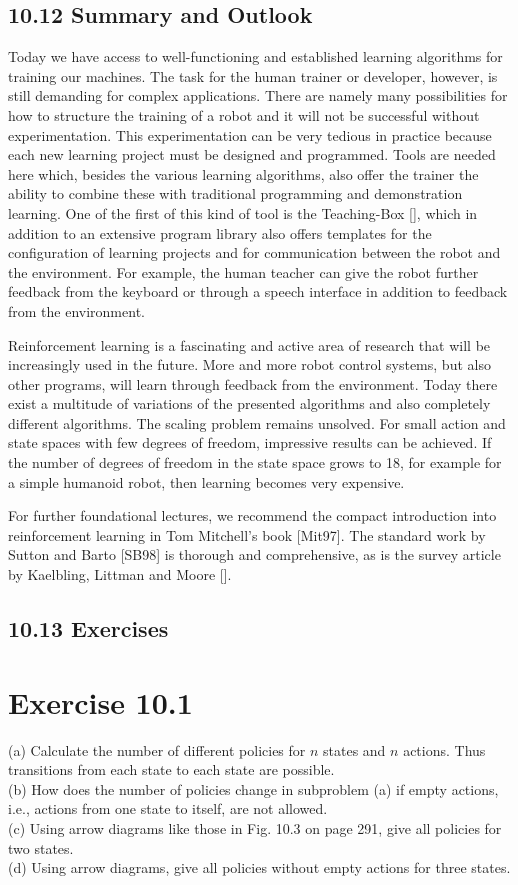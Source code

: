 \documentclass[10pt]{article}
\begin{document}
\subsection*{10.12 Summary and Outlook}
Today we have access to well-functioning and established learning algorithms for training our machines. The task for the human trainer or developer, however, is still demanding for complex applications. There are namely many possibilities for how to structure the training of a robot and it will not be successful without experimentation. This experimentation can be very tedious in practice because each new learning project must be designed and programmed. Tools are needed here which, besides the various learning algorithms, also offer the trainer the ability to combine these with traditional programming and demonstration learning. One of the first of this kind of tool is the Teaching-Box [\cite{ertel2009teachingbox}], which in addition to an extensive program library also offers templates for the configuration of learning projects and for communication between the robot and the environment. For example, the human teacher can give the robot further feedback from the keyboard or through a speech interface in addition to feedback from the environment.


Reinforcement learning is a fascinating and active area of research that will be increasingly used in the future. More and more robot control systems, but also other programs, will learn through feedback from the environment. Today there exist a multitude of variations of the presented algorithms and also completely different algorithms. The scaling problem remains unsolved. For small action and state spaces with few degrees of freedom, impressive results can be achieved. If the number of degrees of freedom in the state space grows to 18, for example for a simple humanoid robot, then learning becomes very expensive.

For further foundational lectures, we recommend the compact introduction into reinforcement learning in Tom Mitchell's book [Mit97]. The standard work by Sutton and Barto [SB98] is thorough and comprehensive, as is the survey article by Kaelbling, Littman and Moore [\cite{kaelbling1996reinforcement}].

\subsection*{10.13 Exercises}
\section*{Exercise 10.1}
(a) Calculate the number of different policies for $n$ states and $n$ actions. Thus transitions from each state to each state are possible.\\
(b) How does the number of policies change in subproblem (a) if empty actions, i.e., actions from one state to itself, are not allowed.\\
(c) Using arrow diagrams like those in Fig. 10.3 on page 291, give all policies for two states.\\
(d) Using arrow diagrams, give all policies without empty actions for three states.
\end{document}

